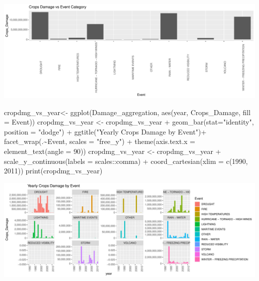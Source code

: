 \documentclass[
]{article}
\newenvironment{Shaded}{\begin{snugshade}}{\end{snugshade}}
\newcommand{\AttributeTok}[1]{\textcolor[rgb]{0.77,0.63,0.00}{#1}}
\newcommand{\DecValTok}[1]{\textcolor[rgb]{0.00,0.00,0.81}{#1}}
\newcommand{\FunctionTok}[1]{\textcolor[rgb]{0.00,0.00,0.00}{#1}}
\newcommand{\NormalTok}[1]{#1}
\newcommand{\OtherTok}[1]{\textcolor[rgb]{0.56,0.35,0.01}{#1}}
\newcommand{\SpecialCharTok}[1]{\textcolor[rgb]{0.00,0.00,0.00}{#1}}
\newcommand{\StringTok}[1]{\textcolor[rgb]{0.31,0.60,0.02}{#1}}
\begin{document}
\includegraphics{RepData_PeerAssessment2_files/figure-latex/Crops Results-1.pdf}

\begin{Shaded}
\begin{Highlighting}[]
\NormalTok{cropdmg\_vs\_year}\OtherTok{\textless{}{-}} \FunctionTok{ggplot}\NormalTok{(Damage\_aggregation, }\FunctionTok{aes}\NormalTok{(year, Crops\_Damage, }\AttributeTok{fill =}\NormalTok{ Event))}
\NormalTok{cropdmg\_vs\_year }\OtherTok{\textless{}{-}}\NormalTok{ cropdmg\_vs\_year }\SpecialCharTok{+} \FunctionTok{geom\_bar}\NormalTok{(}\AttributeTok{stat=}\StringTok{"identity"}\NormalTok{, }\AttributeTok{position =} \StringTok{"dodge"}\NormalTok{) }\SpecialCharTok{+} \FunctionTok{ggtitle}\NormalTok{(}\StringTok{"Yearly Crops Damage by Event"}\NormalTok{)}\SpecialCharTok{+} \FunctionTok{facet\_wrap}\NormalTok{(.}\SpecialCharTok{\textasciitilde{}}\NormalTok{Event, }\AttributeTok{scales =} \StringTok{"free\_y"}\NormalTok{) }\SpecialCharTok{+} \FunctionTok{theme}\NormalTok{(}\AttributeTok{axis.text.x =} \FunctionTok{element\_text}\NormalTok{(}\AttributeTok{angle =} \DecValTok{90}\NormalTok{))}
\NormalTok{cropdmg\_vs\_year }\OtherTok{\textless{}{-}}\NormalTok{ cropdmg\_vs\_year  }\SpecialCharTok{+} \FunctionTok{scale\_y\_continuous}\NormalTok{(}\AttributeTok{labels =}\NormalTok{ scales}\SpecialCharTok{::}\NormalTok{comma) }\SpecialCharTok{+} \FunctionTok{coord\_cartesian}\NormalTok{(}\AttributeTok{xlim =} \FunctionTok{c}\NormalTok{(}\DecValTok{1990}\NormalTok{, }\DecValTok{2011}\NormalTok{))}
\FunctionTok{print}\NormalTok{(cropdmg\_vs\_year)}
\end{Highlighting}
\end{Shaded}

\includegraphics{RepData_PeerAssessment2_files/figure-latex/Crops Results-2.pdf}
\end{document}
